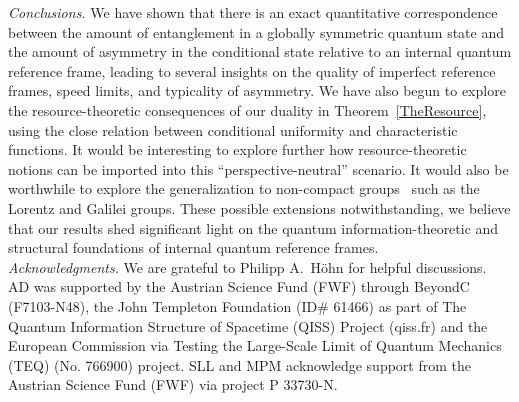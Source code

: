 \documentclass[aps,10pt,twocolumn,showpacs,pra,citeautoscript,amsmath,amssymb,floatfix,superscriptaddress]{revtex4-1}
\begin{document}
\emph{Conclusions.} We have shown that there is an exact quantitative correspondence between the amount of entanglement in a globally symmetric quantum state and the amount of asymmetry in the conditional state relative to an internal quantum reference frame, leading to several insights on the quality of imperfect reference frames, speed limits, and typicality of asymmetry. We have also begun to explore the resource-theoretic consequences of our duality in Theorem~\ref{TheResource}, using the close relation between conditional uniformity and characteristic functions. It would be interesting to explore further how resource-theoretic notions can be imported into this ``perspective-neutral'' scenario. It would also be worthwhile to explore the generalization to non-compact groups~\cite{DGHLM21} such as the Lorentz and Galilei groups. These possible extensions notwithstanding, we believe that our results shed significant light on the quantum information-theoretic and structural foundations of internal quantum reference frames.\\



\emph{Acknowledgments.} We are grateful to Philipp A.\ H\"ohn for helpful discussions. AD was supported by the Austrian Science Fund (FWF) through BeyondC (F7103-N48), the John Templeton Foundation (ID\# 61466) as part of The Quantum Information Structure of Spacetime (QISS) Project (qiss.fr) and the European Commission via Testing the Large-Scale Limit of Quantum Mechanics (TEQ) (No. 766900) project. SLL and MPM acknowledge support from the Austrian Science Fund (FWF) via project P 33730-N.
\end{document}
